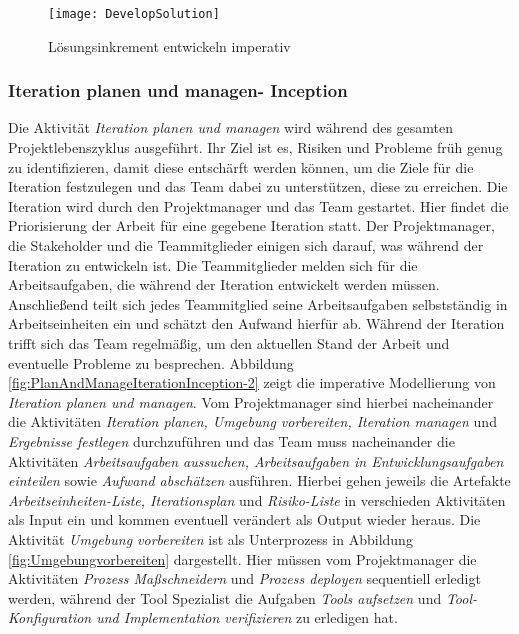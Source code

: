  
\begin{figure}[htp]
\begin{center}
  \texttt{[image: DevelopSolution]} %
  \caption{Lösungsinkrement entwickeln imperativ}
  \label{fig:Dev}
\end{center}
\end{figure}

\subsubsection{Iteration planen und managen- Inception}

Die Aktivität \textit{Iteration planen und managen} wird während des gesamten Projektlebenszyklus ausgeführt. Ihr Ziel ist es, Risiken und Probleme früh genug zu identifizieren, damit diese entschärft werden können, um die Ziele für die Iteration festzulegen und das Team dabei zu unterstützen, diese zu erreichen.\newline
Die Iteration wird durch den Projektmanager und das Team gestartet. Hier findet die Priorisierung der Arbeit für eine gegebene Iteration statt. Der Projektmanager, die Stakeholder und die Teammitglieder einigen sich darauf, was während der Iteration zu entwickeln ist.\newline
Die Teammitglieder melden sich für die Arbeitsaufgaben, die während der Iteration entwickelt werden müssen. Anschließend teilt sich jedes Teammitglied seine Arbeitsaufgaben selbstständig in Arbeitseinheiten ein und schätzt den Aufwand hierfür ab.\newline
Während der Iteration trifft sich das Team regelmäßig, um den aktuellen Stand der Arbeit und eventuelle Probleme zu besprechen. \newline
Abbildung \ref{fig:PlanAndManageIterationInception-2} zeigt die imperative Modellierung von \textit{Iteration planen und managen}. \newline
Vom Projektmanager sind hierbei nacheinander die Aktivitäten \textit{Iteration planen, Umgebung vorbereiten, Iteration managen} und \textit{Ergebnisse festlegen} durchzuführen und das Team muss nacheinander die Aktivitäten \textit{Arbeitsaufgaben aussuchen, Arbeitsaufgaben in Entwicklungsaufgaben einteilen} sowie \textit{Aufwand abschätzen} ausführen. Hierbei gehen jeweils die Artefakte \textit{Arbeitseinheiten-Liste, Iterationsplan} und \textit{Risiko-Liste} in verschieden Aktivitäten als Input ein und kommen eventuell verändert als Output wieder heraus. \newline
Die Aktivität \textit{Umgebung vorbereiten} ist als Unterprozess in Abbildung \ref{fig:Umgebungvorbereiten} dargestellt. Hier müssen vom Projektmanager die Aktivitäten \textit{Prozess Maßschneidern} und \textit{Prozess deployen} sequentiell erledigt werden, während der Tool Spezialist die Aufgaben \textit{Tools aufsetzen} und \textit{Tool-Konfiguration und Implementation verifizieren} zu erledigen hat.


